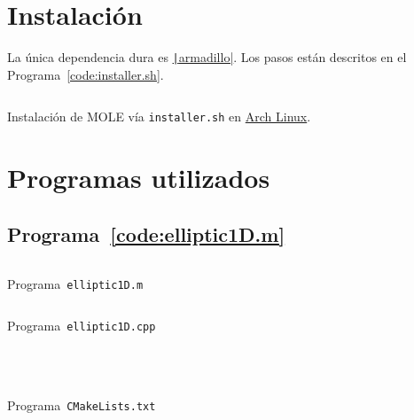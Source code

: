 \section{Instalación}

La única dependencia dura es
\href{https://arma.sourceforge.net/docs.html}{\texttt|armadillo|}.
Los pasos están descritos en el Programa~\ref{code:installer.sh}.

\begin{listing}[ht!]
    \tiny
    \centering
    \inputminted[frame=single,framesep=10pt,linenos,firstline=1,lastline=16,highlightlines={7,13}]{bash}{installer.sh}
    \caption{Instalación de MOLE vía \texttt{installer.sh} en \href{https://archlinux.org}{Arch Linux}.}
    \label{code:installer.sh}
\end{listing}

\section{Programas utilizados}

\subsection{Programa~\ref{code:elliptic1D.m}}

\begin{listing}[ht!]
    \tiny
    \centering
    \inputminted[frame=single,framesep=10pt,linenos,firstline=1,lastline=51,highlightlines={21,29}]{octave}{../examples/octave/elliptic1D.m}
    \caption{Programa~\texttt{elliptic1D.m}}
    \label{code:elliptic1D.m}
\end{listing}

\begin{listing}[ht!]
    \tiny
    \centering
    \inputminted[frame=single,framesep=10pt,linenos,firstline=1,lastline=63,highlightlines={23,26}]{cpp}{../examples/cpp/elliptic1D.cpp}
    \caption{Programa~\texttt{elliptic1D.cpp}}
    \label{code:elliptic1D.cpp}
\end{listing}

\begin{listing}[ht!]
    \tiny
    \centering
    \inputminted[firstline=1,lastline=8,highlightlines={7}]{cmake}{../examples/cpp/CMakeLists.txt}
    \inputminted[firstline=14,lastline=14]{cmake}{../examples/cpp/CMakeLists.txt}
    \inputminted[firstline=16,lastline=16,highlightlines={16}]{cmake}{../examples/cpp/CMakeLists.txt}
    \inputminted[firstline=65,lastline=69]{cmake}{../examples/cpp/CMakeLists.txt}
    \caption{Programa~\texttt{CMakeLists.txt}}
    \label{code:CMakeLists.txt}
\end{listing}

